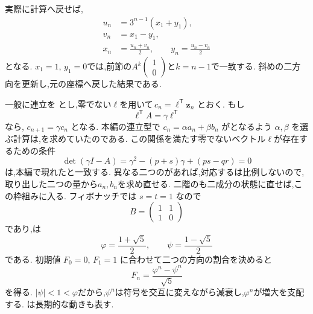 実際に計算へ戻せば,
\[
  \begin{aligned}
    u_n&=3^{n-1}(x_1+y_1),\\
    v_n&=x_1-y_1,\\
    x_n&=\frac{u_n+v_n}{2},\qquad
    y_n=\frac{u_n-v_n}{2}
  \end{aligned}
\]
となる.
$x_1=1$, $y_1=0$では,前節の$A^k\begin{pmatrix}1\\0\end{pmatrix}$と$k=n-1$で一致する.
斜めの二方向を更新し,元の座標へ戻した結果である.

一般に連立を
\BookMathLayout{\[
  \boldsymbol{z}_{n+1}=A\boldsymbol{z}_n,
  \qquad
  \boldsymbol{z}_n=\begin{pmatrix}a_n\\b_n\end{pmatrix},
  \qquad
  A=\begin{pmatrix}p&q\\r&s\end{pmatrix}
\]}{
\[
\begin{aligned}
\boldsymbol z_{n+1}&=A\boldsymbol z_n,\\
\boldsymbol z_n&=\begin{pmatrix}a_n\\b_n\end{pmatrix},\quad
A=\begin{pmatrix}p&q\\r&s\end{pmatrix}
\end{aligned}
\]
}
とし,零でない$\boldsymbol{\ell}$を用いて$\,c_n=\boldsymbol{\ell}^{\mathsf T}\boldsymbol{z}_n$ とおく.
もし
\[
  \boldsymbol{\ell}^{\mathsf T}A
  =\gamma\boldsymbol{\ell}^{\mathsf T}
\]
なら,\,$\,c_{n+1}=\gamma c_n$ となる.
本編の連立型で $c_n=\alpha a_n+\beta b_n$ がとなるよう $\alpha,\beta$ を選ぶ計算は,を求めていたのである.
この関係を満たす零でないベクトル$\boldsymbol{\ell}$が存在するための条件
\[
  \det(\gamma I-A)
  =\gamma^2-(p+s)\gamma+(ps-qr)=0
\]
は,本編で現れたと一致する.
異なる二つのがあれば,対応するは比例しないので,取り出した二つの量から$a_n,b_n$を求め直せる.
二階のも二成分の状態に直せば,この枠組みに入る.
フィボナッチでは $s=t=1$ なので
\[
  B=\begin{pmatrix}1&1\\1&0\end{pmatrix}
\]
であり,は
\[
  \varphi=\frac{1+\sqrt5}{2},
  \qquad
  \psi=\frac{1-\sqrt5}{2}
\]
である.
初期値 $F_0=0,\,F_1=1$ に合わせて二つの方向の割合を決めると
\[
  F_n=\frac{\varphi^n-\psi^n}{\sqrt5}
\]
を得る.
$|\psi|<1<\varphi$だから,$\psi^n$は符号を交互に変えながら減衰し,$\varphi^n$が増大を支配する.
は長期的な動きも表す.

